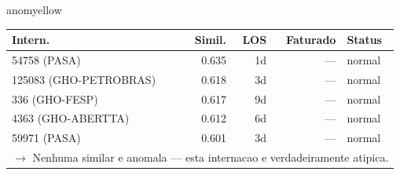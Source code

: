 \documentclass[a4paper,10pt]{article}
\begin{document}
\begin{anomalycard}[Internacao 166618 | GHO-PETROBRAS | MODERADO (z=2.27)]{anomyellow}
\begin{tabular}{l r r r l}\toprule\textbf{Intern.} & \textbf{Simil.} & \textbf{LOS} & \textbf{Faturado} & \textbf{Status} \\\midrule
54758 (PASA) & 0.635 & 1d & --- & \textcolor{jcubeblue}{normal} \\
125083 (GHO-PETROBRAS) & 0.618 & 3d & --- & \textcolor{jcubeblue}{normal} \\
336 (GHO-FESP) & 0.617 & 9d & --- & \textcolor{jcubeblue}{normal} \\
4363 (GHO-ABERTTA) & 0.612 & 6d & --- & \textcolor{jcubeblue}{normal} \\
59971 (PASA) & 0.601 & 3d & --- & \textcolor{jcubeblue}{normal} \\
\multicolumn{5}{l}{\textcolor{jcubeblue}{\small $\rightarrow$ Nenhuma similar e anomala --- esta internacao e verdadeiramente atipica.}} \\
\bottomrule\end{tabular}


\end{anomalycard}

\newpage
\end{document}

